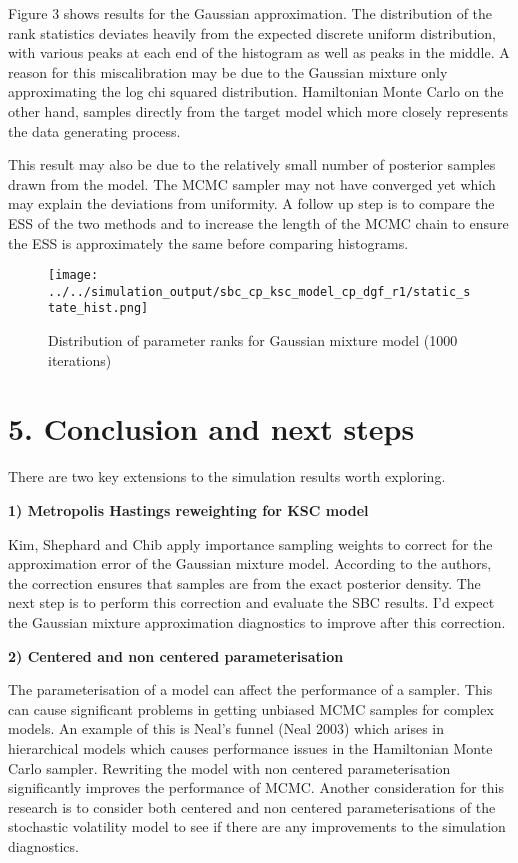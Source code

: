 \documentclass[
  12pt,
  letterpaper,
  DIV=11,
  numbers=noendperiod]{scrartcl}
\begin{document}
Figure 3 shows results for the Gaussian approximation. The distribution
of the rank statistics deviates heavily from the expected discrete
uniform distribution, with various peaks at each end of the histogram as
well as peaks in the middle. A reason for this miscalibration may be due
to the Gaussian mixture only approximating the log chi squared
distribution. Hamiltonian Monte Carlo on the other hand, samples
directly from the target model which more closely represents the data
generating process.

This result may also be due to the relatively small number of posterior
samples drawn from the model. The MCMC sampler may not have converged
yet which may explain the deviations from uniformity. A follow up step
is to compare the ESS of the two methods and to increase the length of
the MCMC chain to ensure the ESS is approximately the same before
comparing histograms.

\begin{figure}[H]

{\centering \texttt{[image: ../../simulation\_output/sbc\_cp\_ksc\_model\_cp\_dgf\_r1/static\_state\_hist.png]}

}

\caption{Distribution of parameter ranks for Gaussian mixture model
(1000 iterations)}

\end{figure}

\hypertarget{conclusion-and-next-steps}{%
\section{5. Conclusion and next steps}\label{conclusion-and-next-steps}}

There are two key extensions to the simulation results worth exploring.

\textbf{1) Metropolis Hastings reweighting for KSC model}

Kim, Shephard and Chib apply importance sampling weights to correct for
the approximation error of the Gaussian mixture model. According to the
authors, the correction ensures that samples are from the exact
posterior density. The next step is to perform this correction and
evaluate the SBC results. I'd expect the Gaussian mixture approximation
diagnostics to improve after this correction.

\textbf{2) Centered and non centered parameterisation}

The parameterisation of a model can affect the performance of a sampler.
This can cause significant problems in getting unbiased MCMC samples for
complex models. An example of this is Neal's funnel (Neal 2003) which
arises in hierarchical models which causes performance issues in the
Hamiltonian Monte Carlo sampler. Rewriting the model with non centered
parameterisation significantly improves the performance of MCMC. Another
consideration for this research is to consider both centered and non
centered parameterisations of the stochastic volatility model to see if
there are any improvements to the simulation diagnostics.
\end{document}
